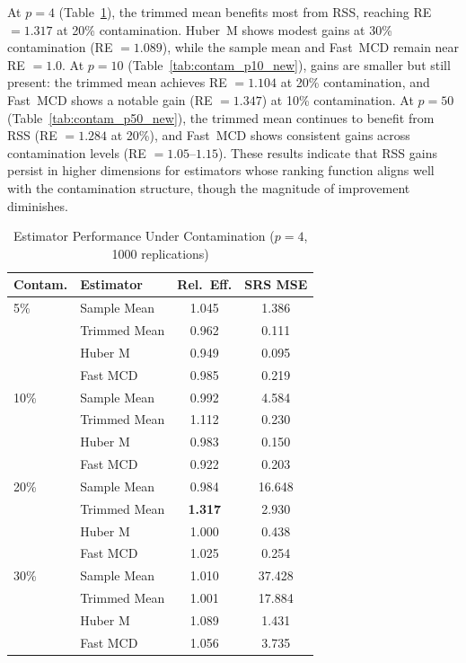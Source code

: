 \documentclass[12pt]{article}
\begin{document}
At $p = 4$ (Table~\ref{tab:contam_p4_new}), the trimmed mean benefits most from RSS, reaching RE $= 1.317$ at 20\% contamination. Huber~M shows modest gains at 30\% contamination (RE $= 1.089$), while the sample mean and Fast~MCD remain near RE $= 1.0$. At $p = 10$ (Table~\ref{tab:contam_p10_new}), gains are smaller but still present: the trimmed mean achieves RE $= 1.104$ at 20\% contamination, and Fast~MCD shows a notable gain (RE $= 1.347$) at 10\% contamination. At $p = 50$ (Table~\ref{tab:contam_p50_new}), the trimmed mean continues to benefit from RSS (RE $= 1.284$ at 20\%), and Fast~MCD shows consistent gains across contamination levels (RE $= 1.05$--$1.15$). These results indicate that RSS gains persist in higher dimensions for estimators whose ranking function aligns well with the contamination structure, though the magnitude of improvement diminishes.

\begin{table}[htbp]
\centering
\caption{Estimator Performance Under Contamination ($p = 4$, 1000 replications)}
\label{tab:contam_p4_new}
\begin{tabular}{llcc}
\toprule
Contam. & Estimator & Rel.\ Eff. & SRS MSE \\
\midrule
5\% & Sample Mean & 1.045 & 1.386 \\
& Trimmed Mean & 0.962 & 0.111 \\
& Huber M & 0.949 & 0.095 \\
& Fast MCD & 0.985 & 0.219 \\
\midrule
10\% & Sample Mean & 0.992 & 4.584 \\
& Trimmed Mean & 1.112 & 0.230 \\
& Huber M & 0.983 & 0.150 \\
& Fast MCD & 0.922 & 0.203 \\
\midrule
20\% & Sample Mean & 0.984 & 16.648 \\
& Trimmed Mean & \textbf{1.317} & 2.930 \\
& Huber M & 1.000 & 0.438 \\
& Fast MCD & 1.025 & 0.254 \\
\midrule
30\% & Sample Mean & 1.010 & 37.428 \\
& Trimmed Mean & 1.001 & 17.884 \\
& Huber M & 1.089 & 1.431 \\
& Fast MCD & 1.056 & 3.735 \\
\bottomrule
\end{tabular}
\end{table}
\end{document}
